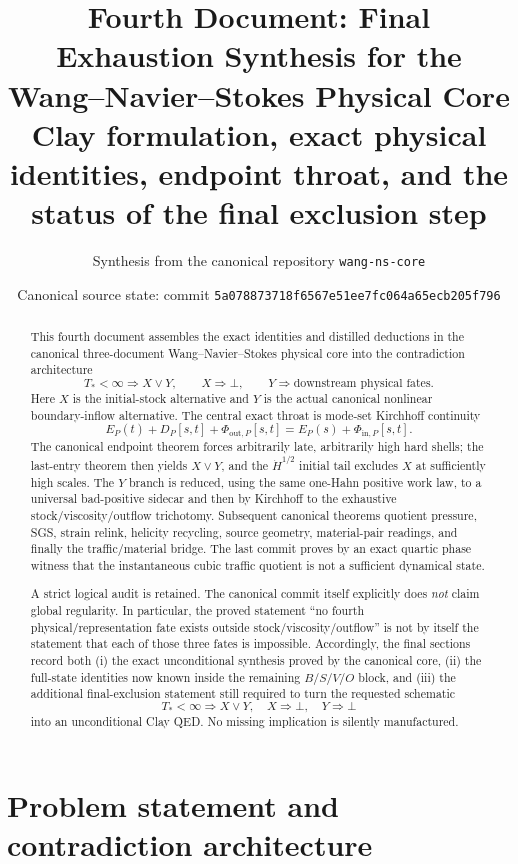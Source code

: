 \documentclass[11pt]{article}
\title{Fourth Document: Final Exhaustion Synthesis for the Wang--Navier--Stokes Physical Core\\
\large Clay formulation, exact physical identities, endpoint throat, and the status of the final exclusion step}
\author{Synthesis from the canonical repository \texttt{wang-ns-core}}
\date{Canonical source state: commit \texttt{5a078873718f6567e51ee7fc064a65ecb205f796}}
\newcommand{\Hdot}{\dot H}
\begin{document}
\maketitle

\begin{abstract}
This fourth document assembles the exact identities and distilled deductions in the canonical three-document Wang--Navier--Stokes physical core into the contradiction architecture
\[
T_*<\infty\Longrightarrow X\vee Y,
\qquad X\Longrightarrow\bot,
\qquad Y\Longrightarrow \text{downstream physical fates}.
\]
Here $X$ is the initial-stock alternative and $Y$ is the actual canonical nonlinear boundary-inflow alternative.  The central exact throat is mode-set Kirchhoff continuity
\[
E_P(t)+D_P[s,t]+\Phi_{\mathrm{out},P}[s,t]
=E_P(s)+\Phi_{\mathrm{in},P}[s,t].
\]
The canonical endpoint theorem forces arbitrarily late, arbitrarily high hard shells; the last-entry theorem then yields $X\vee Y$, and the $\Hdot^{1/2}$ initial tail excludes $X$ at sufficiently high scales.  The $Y$ branch is reduced, using the same one-Hahn positive work law, to a universal bad-positive sidecar and then by Kirchhoff to the exhaustive stock/viscosity/outflow trichotomy.  Subsequent canonical theorems quotient pressure, SGS, strain relink, helicity recycling, source geometry, material-pair readings, and finally the traffic/material bridge.  The last commit proves by an exact quartic phase witness that the instantaneous cubic traffic quotient is not a sufficient dynamical state.

A strict logical audit is retained.  The canonical commit itself explicitly does \emph{not} claim global regularity.  In particular, the proved statement ``no fourth physical/representation fate exists outside stock/viscosity/outflow'' is not by itself the statement that each of those three fates is impossible.  Accordingly, the final sections record both (i) the exact unconditional synthesis proved by the canonical core, (ii) the full-state identities now known inside the remaining $B/S/V/O$ block, and (iii) the additional final-exclusion statement still required to turn the requested schematic
\[
T_*<\infty\Rightarrow X\vee Y,
\quad X\Rightarrow\bot,
\quad Y\Rightarrow\bot
\]
into an unconditional Clay QED.  No missing implication is silently manufactured.
\end{abstract}

\tableofcontents

\section{Problem statement and contradiction architecture}
\end{document}
